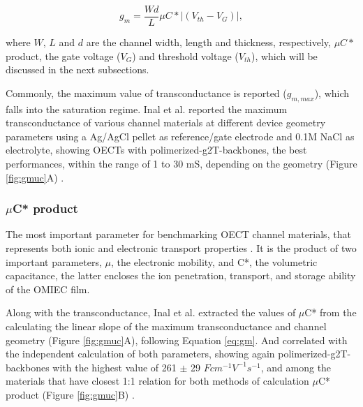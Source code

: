 \begin{equation}\label{eq:gm}
	g_{m} = \frac{Wd}{L} \mu C* |(V_{th} - V_{G})|,
\end{equation}

where $W$, $L$ and $d$ are the channel width, length and thickness, respectively, $\mu C*$ product, the gate voltage ($V_{G}$) and threshold voltage ($V_{th}$), which will be discussed in the next subsections.

Commonly, the maximum value of transconductance is reported ($g_{m,max}$), which falls into the saturation regime. Inal et al. reported the maximum transconductance of various channel materials at different device geometry parameters using a Ag/AgCl pellet as reference/gate electrode and 0.1M NaCl as electrolyte, showing OECTs with polimerized-g2T-backbones, the best performances, within the range of 1 to 30 mS, depending on the geometry (Figure \ref{fig:gmuc}A) \cite{inalBenchmarkingOrganicMixed2017}.

\subsubsection{$\mu$C* product}

The most important parameter for benchmarking OECT channel materials, that represents both ionic and electronic transport properties %
\cite{inalBenchmarkingOrganicMixed2017}. %
It is the product of two important parameters, $\mu$, the electronic mobility, and C*, the volumetric capacitance, the latter encloses the ion penetration, transport, and storage ability of the OMIEC film.

Along with the transconductance, Inal et al. extracted the values of $\mu$C* from the calculating the linear slope of the maximum transconductance and channel geometry (Figure \ref{fig:gmuc}A), following Equation \ref{eq:gm}. And correlated with the independent calculation of both parameters, showing again polimerized-g2T-backbones with the highest value of 261 $\pm$ 29 $Fcm^{-1}V^{-1}s^{-1}$,   and among the materials that have closest 1:1 relation for both methods of calculation $\mu$C* product (Figure \ref{fig:gmuc}B) \cite{inalBenchmarkingOrganicMixed2017}.
 
